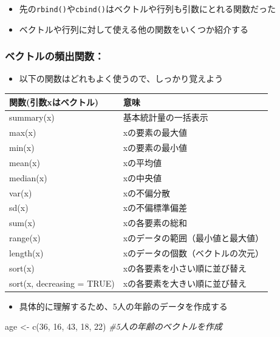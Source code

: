 \documentclass[
]{book}
\newenvironment{Shaded}{\begin{snugshade}}{\end{snugshade}}
\newcommand{\CommentTok}[1]{\textcolor[rgb]{0.56,0.35,0.01}{\textit{#1}}}
\newcommand{\DecValTok}[1]{\textcolor[rgb]{0.00,0.00,0.81}{#1}}
\newcommand{\FunctionTok}[1]{\textcolor[rgb]{0.00,0.00,0.00}{#1}}
\newcommand{\NormalTok}[1]{#1}
\newcommand{\OtherTok}[1]{\textcolor[rgb]{0.56,0.35,0.01}{#1}}
\providecommand{\tightlist}{%
  \setlength{\itemsep}{0pt}\setlength{\parskip}{0pt}}
\begin{document}
\begin{itemize}
\tightlist
\item
  先の\texttt{rbind()}や\texttt{cbind()}はベクトルや行列も引数にとれる関数だった
\item
  ベクトルや行列に対して使える他の関数をいくつか紹介する
\end{itemize}

\hypertarget{ux30d9ux30afux30c8ux30ebux306eux983bux51faux95a2ux6570}{%
\subsubsection*{ベクトルの頻出関数：}\label{ux30d9ux30afux30c8ux30ebux306eux983bux51faux95a2ux6570}}

\begin{itemize}
\tightlist
\item
  以下の関数はどれもよく使うので、しっかり覚えよう
\end{itemize}

\begin{longtable}[]{@{}ll@{}}
\toprule()
関数(引数xはベクトル) & 意味 \\
\midrule()
\endhead
summary(x) & 基本統計量の一括表示 \\
max(x) & xの要素の最大値 \\
min(x) & xの要素の最小値 \\
mean(x) & xの平均値 \\
median(x) & xの中央値 \\
var(x) & xの不偏分散 \\
sd(x) & xの不偏標準偏差 \\
sum(x) & xの各要素の総和 \\
range(x) & xのデータの範囲（最小値と最大値） \\
length(x) & xのデータの個数（ベクトルの次元） \\
sort(x) & xの各要素を小さい順に並び替え \\
sort(x, decreasing = TRUE) & xの各要素を大きい順に並び替え \\
\bottomrule()
\end{longtable}

\begin{itemize}
\tightlist
\item
  具体的に理解するため、5人の年齢のデータを作成する
\end{itemize}

\begin{Shaded}
\begin{Highlighting}[]
\NormalTok{age }\OtherTok{\textless{}{-}} \FunctionTok{c}\NormalTok{(}\DecValTok{36}\NormalTok{, }\DecValTok{16}\NormalTok{, }\DecValTok{43}\NormalTok{, }\DecValTok{18}\NormalTok{, }\DecValTok{22}\NormalTok{) }\CommentTok{\#5人の年齢のベクトルを作成}
\end{Highlighting}
\end{Shaded}
\end{document}
